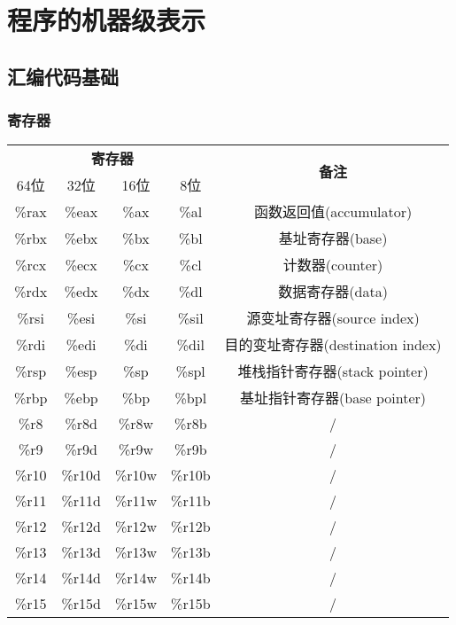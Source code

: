\section{程序的机器级表示}

\subsection{汇编代码基础}
\subsubsection{寄存器}
\begin{table}[H]
    \centering
    \begin{tabular}{|c|c|c|c|c|}
        \hline
        \multicolumn{4}{|c|}{\textbf{寄存器}} & \multirow{2}{*}{\textbf{备注}} \\
        \cline{1-4}
        64位 & 32位 & 16位 & 8位 & \\
        \hline
        \%rax & \%eax & \%ax & \%al & 函数返回值(accumulator) \\
        \hline
        \%rbx & \%ebx & \%bx & \%bl & 基址寄存器(base)  \\
        \hline
        \%rcx & \%ecx & \%cx & \%cl & 计数器(counter) \\
        \hline
        \%rdx & \%edx & \%dx & \%dl & 数据寄存器(data)  \\
        \hline
        \%rsi & \%esi & \%si & \%sil & 源变址寄存器(source index)  \\
        \hline
        \%rdi & \%edi & \%di & \%dil & 目的变址寄存器(destination index)  \\
        \hline
        \%rsp & \%esp & \%sp & \%spl & 堆栈指针寄存器(stack pointer) \\
        \hline
        \%rbp & \%ebp & \%bp & \%bpl & 基址指针寄存器(base pointer) \\
        \hline
        \%r8  & \%r8d & \%r8w & \%r8b & / \\
        \hline
        \%r9  & \%r9d & \%r9w & \%r9b & / \\
        \hline
        \%r10 & \%r10d & \%r10w & \%r10b & / \\
        \hline
        \%r11 & \%r11d & \%r11w & \%r11b & / \\
        \hline
        \%r12 & \%r12d & \%r12w & \%r12b & / \\
        \hline
        \%r13 & \%r13d & \%r13w & \%r13b & / \\
        \hline
        \%r14 & \%r14d & \%r14w & \%r14b & / \\
        \hline
        \%r15 & \%r15d & \%r15w & \%r15b & / \\
        \hline
    \end{tabular}
\end{table}

